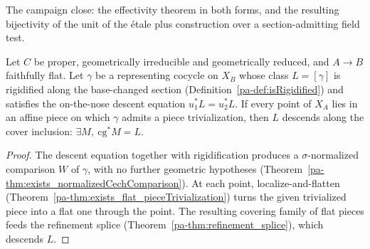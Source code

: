 The campaign close: the effectivity theorem in both forms, and the resulting bijectivity of the unit
of the \'etale plus construction over a section-admitting field test.

\begin{theorem}
  \label{pa-thm:effectivity_of_pieces}
  \leanok

  Let \(C\) be proper, geometrically irreducible and geometrically reduced, and \(A \to B\)
  faithfully flat. Let \(\gamma\) be a representing cocycle on \(X_B\) whose class \(L = [\gamma]\) is
  rigidified along the base-changed section (Definition~\ref{pa-def:isRigidified}) and satisfies the
  on-the-nose descent equation \(u_1^{*}L = u_2^{*}L\). If every point of \(X_A\) lies in an affine
  piece on which \(\gamma\) admits a piece trivialization, then \(L\) descends along the cover
  inclusion: \(\exists M,\ \mathrm{cg}^{*}M = L\).
\end{theorem}
\begin{proof}
  \leanok
  The descent equation together with rigidification produces a \(\sigma\)-normalized comparison \(W\)
  of \(\gamma\), with no further geometric hypotheses
  (Theorem~\ref{pa-thm:exists_normalizedCechComparison}). At each point, localize-and-flatten
  (Theorem~\ref{pa-thm:exists_flat_pieceTrivialization}) turns the given trivialized piece into a flat
  one through the point. The resulting covering family of flat pieces feeds the refinement splice
  (Theorem~\ref{pa-thm:refinement_splice}), which descends \(L\).
\end{proof}

